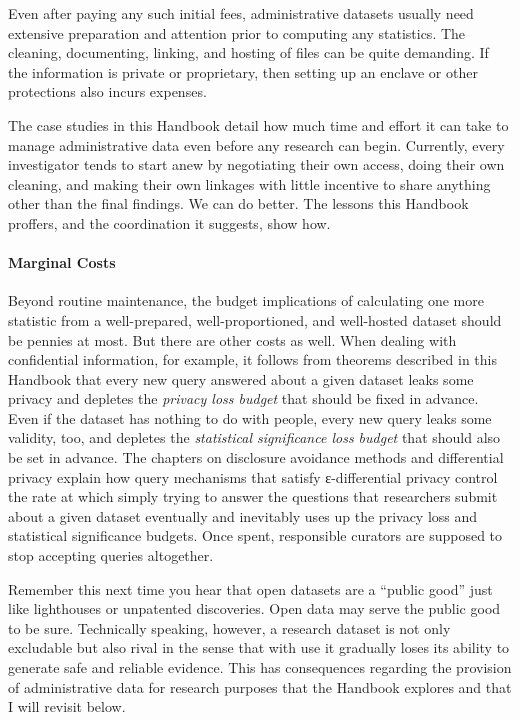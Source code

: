 Even after paying any such initial fees, administrative datasets usually
need extensive preparation and attention prior to computing any
statistics. The cleaning, documenting, linking, and hosting of files can
be quite demanding. If the information is private or proprietary, then
setting up an enclave or other protections also incurs expenses.

The case studies in this Handbook detail how much time and effort it can
take to manage administrative data even before any research can begin.
Currently, every investigator tends to start anew by negotiating their
own access, doing their own cleaning, and making their own linkages with
little incentive to share anything other than the final findings. We can
do better. The lessons this Handbook proffers, and the coordination it
suggests, show how.

\paragraph{Marginal Costs}

Beyond routine maintenance, the budget implications of calculating one
more statistic from a well-prepared, well-proportioned, and well-hosted
dataset should be pennies at most. But there are other costs as well.
When dealing with confidential information, for example, it follows from
theorems described in this Handbook that every new query answered about
a given dataset leaks some privacy and depletes the \emph{privacy loss
budget} that should be fixed in advance. Even if the dataset has nothing
to do with people, every new query leaks some validity, too, and
depletes the \emph{statistical significance loss budget} that should
also be set in advance. The chapters on disclosure avoidance methods and
differential privacy explain how query mechanisms that satisfy
ε-differential privacy control the rate at which simply trying to answer
the questions that researchers submit about a given dataset eventually
and inevitably uses up the privacy loss and statistical significance
budgets. Once spent, responsible curators are supposed to stop accepting
queries altogether.

Remember this next time you hear that open datasets are a ``public
good'' just like lighthouses or unpatented discoveries. Open data may
serve the public good to be sure. Technically speaking, however, a
research dataset is not only excludable but also rival in the sense that
with use it gradually loses its ability to generate safe and reliable
evidence. This has consequences regarding the provision of
administrative data for research purposes that the Handbook explores and
that I will revisit below.


